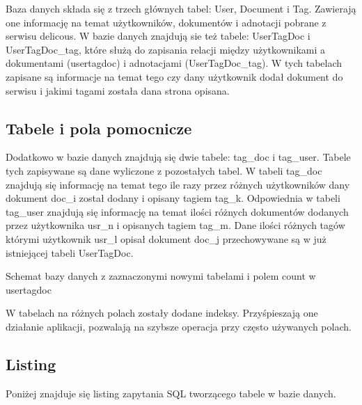 \documentclass[11pt,a4paper]{report}
\begin{document}
Baza danych składa się z trzech głównych tabel: User, Document i Tag. Zawierają one informację na temat użytkowników, dokumentów i adnotacji pobrane z serwisu delicous. W bazie danych znajdują sie też tabele: UserTagDoc i UserTagDoc\_tag, które służą do zapisania relacji między użytkownikami a dokumentami (usertagdoc) i adnotacjami (UserTagDoc\_tag). W tych tabelach zapisane są  informacje na temat tego czy dany użytkownik dodał dokument do serwisu i jakimi tagami została dana strona opisana.








\subsection{Tabele i pola pomocnicze}
Dodatkowo w bazie danych znajdują się dwie tabele: tag\_doc i tag\_user. Tabele tych zapisywane są dane wyliczone z pozostałych tabel. W tabeli tag\_doc znajdują się informację na temat tego ile razy przez różnych użytkowników dany dokument doc\_i  został dodany i opisany tagiem tag\_k. Odpowiednia w tabeli tag\_user znajdują się informację na temat ilości różnych dokumentów dodanych przez użytkownika usr\_n i opisanych tagiem tag\_m. Dane ilości różnych tagów którymi użytkownik usr\_l opisał dokument doc\_j przechowywane są w już istniejącej tabeli UserTagDoc.

Schemat bazy danych z zaznaczonymi nowymi tabelami i polem count w usertagdoc

W tabelach na różnych polach zostały dodane indeksy. Przyśpieszają one działanie aplikacji, pozwalają na szybsze operacja przy często używanych polach.
\subsection{Listing}
Poniżej znajduje się listing zapytania SQL tworzącego tabele w bazie danych.
\end{document}
